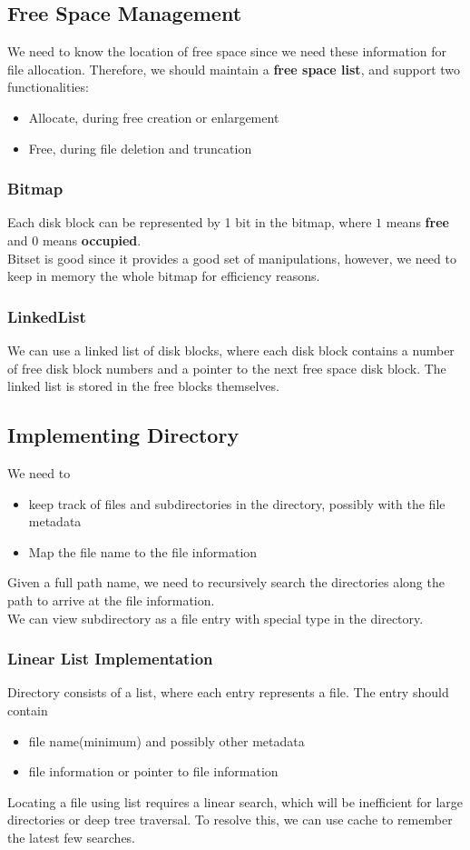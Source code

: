 \documentclass[12pt]{article}
\theoremstyle{definition}
\begin{document}
\subsection{Free Space Management}
We need to know the location of free space since we need these information for file allocation. Therefore, we should maintain a \textbf{free space list}, and support two functionalities:
\begin{itemize}
  \item Allocate, during free creation or enlargement
  \item Free, during file deletion and truncation
\end{itemize}
\subsubsection{Bitmap}
Each disk block can be represented by 1 bit in the bitmap, where $1$ means \textbf{free} and $0$ means \textbf{occupied}.\\
Bitset is good since it provides a good set of manipulations, however, we need to keep in memory the whole bitmap for efficiency reasons.
\subsubsection{LinkedList}
We can use a linked list of disk blocks, where each disk block contains a number of free disk block numbers and a pointer to the next free space disk block.
The linked list is stored in the free blocks themselves.
\subsection{Implementing Directory}
We need to 
\begin{itemize}
\item keep track of files and subdirectories in the directory, possibly with the file metadata
\item Map the file name to the file information
\end{itemize}
Given a full path name, we need to recursively search the directories along the path to arrive at the file information. \\
We can view subdirectory as a file entry with special type in the directory.
\subsubsection{Linear List Implementation}
Directory consists of a list, where each entry represents a file. The entry should contain
\begin{itemize}
  \item file name(minimum) and possibly other metadata
  \item file information or pointer to file information
\end{itemize}
Locating a file using list requires a linear search, which will be inefficient for large directories or deep tree traversal. To resolve this, we can use cache to remember the latest few searches.
\end{document}
